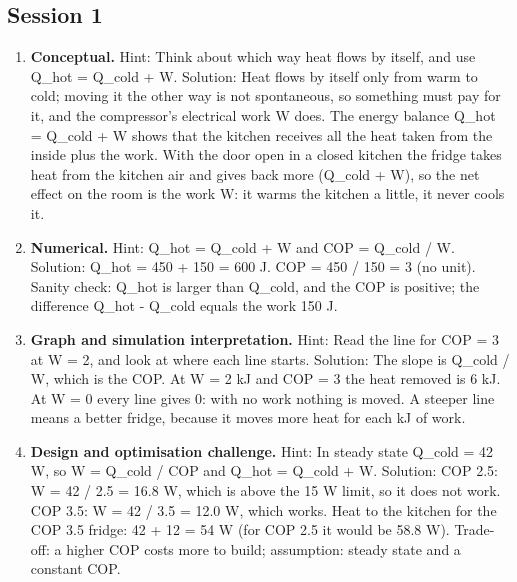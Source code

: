 \documentclass[11pt,a4paper]{article}
\begin{document}
\subsection*{Session 1}
\begin{enumerate}[nosep]
\item \textbf{Conceptual.} Hint: Think about which way heat flows by itself, and use Q\_hot = Q\_cold + W. Solution: Heat flows by itself only from warm to cold; moving it the other way is not spontaneous, so something must pay for it, and the compressor's electrical work W does. The energy balance Q\_hot = Q\_cold + W shows that the kitchen receives all the heat taken from the inside plus the work. With the door open in a closed kitchen the fridge takes heat from the kitchen air and gives back more (Q\_cold + W), so the net effect on the room is the work W: it warms the kitchen a little, it never cools it.
\item \textbf{Numerical.} Hint: Q\_hot = Q\_cold + W and COP = Q\_cold / W. Solution: Q\_hot = 450 + 150 = 600 J. COP = 450 / 150 = 3 (no unit). Sanity check: Q\_hot is larger than Q\_cold, and the COP is positive; the difference Q\_hot - Q\_cold equals the work 150 J.
\item \textbf{Graph and simulation interpretation.} Hint: Read the line for COP = 3 at W = 2, and look at where each line starts. Solution: The slope is Q\_cold / W, which is the COP. At W = 2 kJ and COP = 3 the heat removed is 6 kJ. At W = 0 every line gives 0: with no work nothing is moved. A steeper line means a better fridge, because it moves more heat for each kJ of work.
\item \textbf{Design and optimisation challenge.} Hint: In steady state Q\_cold = 42 W, so W = Q\_cold / COP and Q\_hot = Q\_cold + W. Solution: COP 2.5: W = 42 / 2.5 = 16.8 W, which is above the 15 W limit, so it does not work. COP 3.5: W = 42 / 3.5 = 12.0 W, which works. Heat to the kitchen for the COP 3.5 fridge: 42 + 12 = 54 W (for COP 2.5 it would be 58.8 W). Trade-off: a higher COP costs more to build; assumption: steady state and a constant COP.
\end{enumerate}
\end{document}
